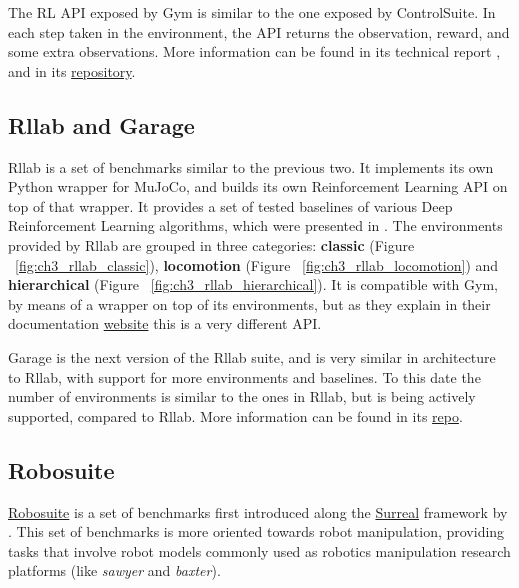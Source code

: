 The RL API exposed by Gym is similar to the one exposed by ControlSuite. 
In each step taken in the environment, the API returns the observation, 
reward, and some extra observations. More information can be found in its 
technical report \citep{Gym}, and in its \href{https://github.com/openai/gym}{repository}.

\subsection{Rllab and Garage} \label{subsec:ch3_rllab}

Rllab is a set of benchmarks similar to the previous two. It implements its own 
Python wrapper for MuJoCo, and builds its own Reinforcement Learning API on top 
of that wrapper. It provides a set of tested baselines of various Deep Reinforcement 
Learning algorithms, which were presented in \cite{Rllab}. The environments provided 
by Rllab are grouped in three categories: \textbf{classic} (Figure ~\ref{fig:ch3_rllab_classic}), 
\textbf{locomotion} (Figure ~\ref{fig:ch3_rllab_locomotion}) and \textbf{hierarchical} 
(Figure ~\ref{fig:ch3_rllab_hierarchical}). It is compatible with Gym, by means of 
a wrapper on top of its environments, but as they explain in their documentation 
\href{https://rllab.readthedocs.io/en/latest/user/gym_integration.html}{website} 
this is a very different API.

\figBenchmarkRllabClassic

\figBenchmarkRllabLocomotion

\figBenchmarkRllabHierarchical

Garage is the next version of the Rllab suite, and is very similar in architecture 
to Rllab, with support for more environments and baselines. To this date the number 
of environments is similar to the ones in Rllab, but is being actively supported, 
compared to Rllab. More information can be found in its \href{https://github.com/rlworkgroup/garage}{repo}.

\subsection{Robosuite}
 
\href{https://github.com/StanfordVL/robosuite/}{Robosuite} is a set of benchmarks first 
introduced along the \href{https://surreal.stanford.edu/}{Surreal} 
framework by \cite{Surreal}. This set of benchmarks is more oriented towards robot manipulation,
providing tasks that involve robot models commonly used as robotics manipulation research platforms 
(like \textit{sawyer} and \textit{baxter}).

